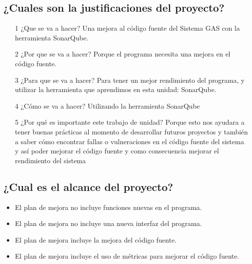 \documentclass[twoside,twocolumn]{article}
\begin{document}
\subsection{¿Cuales son la justificaciones del proyecto?}

\begin{itemize}
\item[1]¿Que se va a hacer? 
\newline
\newline
Una mejora al código fuente del Sistema GAS con la herramienta SonarQube. 
\newline
\item[2]¿Por que se va a hacer? 
\newline
\newline
Porque el programa necesita una mejora en el código fuente. 
\newline
\item[3]¿Para que se va a hacer? 
\newline
\newline
Para tener un mejor rendimiento del programa, y utilizar la herramienta que aprendimos en esta unidad: SonarQube. 
\newline
\item[4]¿Cómo se va a hacer? 
\newline
\newline
Utilizando la herramienta SonarQube 
\newline
\item[5]¿Por qué es importante este trabajo de unidad? 
\newline
\newline
Porque esto nos ayudara a tener buenas prácticas al momento de desarrollar futuros proyectos y también a saber cómo encontrar fallas o vulneraciones en el código fuente del sistema y así poder mejorar el código fuente y como consecuencia mejorar el rendimiento del sistema
\newline
\end{itemize}

\subsection{¿Cual es el alcance del proyecto?}
\begin{itemize}
\item El plan de mejora no incluye funciones nuevas en el programa. 
\newline
\item El plan de mejora no incluye una nueva interfaz del programa. 
\newline
\item El plan de mejora incluye la mejora del código fuente. 
\newline
\item El plan de mejora incluye el uso de métricas para mejorar el código fuente. 
\end{itemize}
\end{document}
